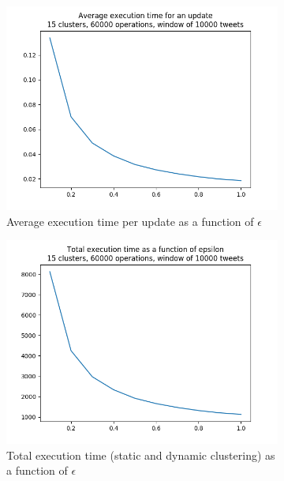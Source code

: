 \documentclass[a4paper,10pt]{article}
\begin{document}
\begin{appendices}
\begin{figure}[h]
	\begin{subfigure}[b]{0.3\textwidth}
		\includegraphics[width=\textwidth]{pictures/average_execution_times_per_update_15_60000_10000.png}
		\caption{Average execution time per update as a function of $\epsilon$}
	\end{subfigure}
	\begin{subfigure}[b]{0.3\textwidth}
		\includegraphics[width=\textwidth]{pictures/final_execution_times_15_60000_10000.png}
		\caption{Total execution time (static and dynamic clustering) as a function of $\epsilon$}
	\end{subfigure}
	\begin{subfigure}[b]{0.3\textwidth}

\end{subfigure}
\end{figure}
\end{appendices}
\end{document}
